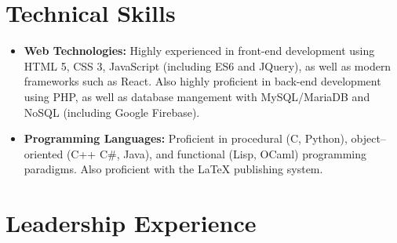 \documentclass[11pt,a4paper,sans]{moderncv}
\begin{document}
\section{Technical Skills}

\vspace{6pt}

\begin{itemize}

\item \textbf{Web Technologies:} Highly experienced in front-end development using HTML 5, CSS 3, JavaScript (including ES6 and JQuery), as well as modern frameworks such as React. Also highly proficient in back-end development using PHP, as well as database mangement with MySQL/MariaDB and NoSQL (including Google Firebase).
  
\vspace{6pt}
    
\item \textbf{Programming Languages:} Proficient in procedural (C, Python), object--oriented (C++ C\#, Java), and functional (Lisp, OCaml) programming paradigms. Also proficient with the LaTeX publishing system.
  
\end{itemize}

\section{Leadership Experience}

\vspace{6pt}
\end{document}
